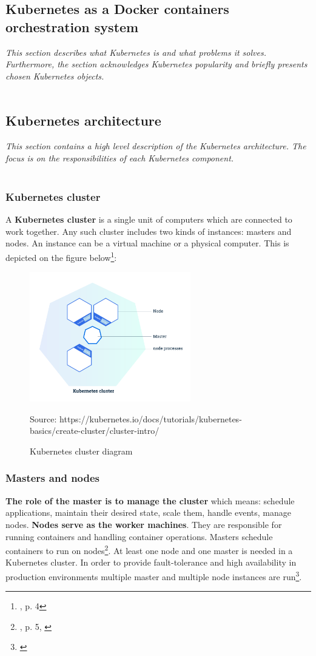 \subsection{Kubernetes as a Docker containers orchestration system}
\textit{This section describes what Kubernetes is and what problems it solves. Furthermore, the section acknowledges Kubernetes popularity and briefly presents chosen Kubernetes objects.}
~\\
~\\
\subsection{Kubernetes architecture}
\textit{This section contains a high level description of the Kubernetes architecture. The focus is on the responsibilities of each Kubernetes component.}
~\\
~\\
\subsubsection{Kubernetes cluster}
A \textbf{Kubernetes cluster} is a single unit of computers which are connected to work together. Any such cluster includes two kinds of instances: masters and nodes. An instance can be a virtual machine or a physical computer. This is depicted on the figure below\footnote{\cite{k8s-cluster}, p. 4}:
\begin{figure}[H]
    \centering
    \includegraphics[width=7cm]{figures/cluster.png}
    \label{fig:cluster}
    \caption{Kubernetes cluster diagram}
    \small{Source: https://kubernetes.io/docs/tutorials/kubernetes-basics/create-cluster/cluster-intro/}
\end{figure}

\subsubsection{Masters and nodes}
\textbf{The role of the master is to manage the cluster} which means: schedule applications, maintain their desired state, scale them, handle events, manage nodes. \textbf{Nodes serve as the worker machines}. They are responsible for running containers and handling container operations. Masters schedule containers to run on nodes\footnote{\cite{book-mastering-k8s}, p. 5, \cite{k8s-cluster}}. At least one node and one master is needed in a Kubernetes cluster. In order to provide fault-tolerance and high availability in production environments multiple master and multiple node instances are run\footnote{\cite{k8s-components}}.

